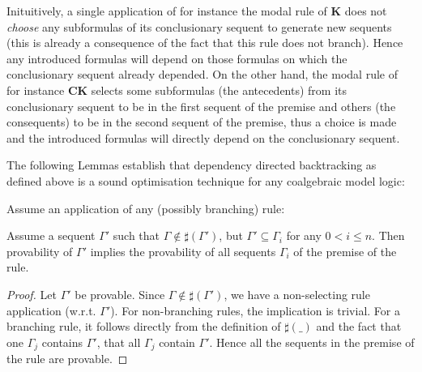\documentclass{llncs}
\begin{document}
Inituitively, a single application of for instance the modal rule of \textbf{K} 
does not \emph{choose} any subformulas of its conclusionary sequent to generate new sequents
(this is already a consequence of the fact that this rule does not branch).
Hence any introduced formulas will depend on those formulas on which the conclusionary sequent
already depended.
On the other hand, the modal rule of for instance \textbf{CK} selects some subformulas (the antecedents)
from its conclusionary sequent to be in the first sequent of the premise and others
(the consequents) to be in the second sequent of the premise, thus a choice is made and the
introduced formulas will directly depend on the conclusionary sequent.

The following Lemmas establish that dependency directed backtracking as defined above
is a sound optimisation technique for any coalgebraic model logic:

\begin{lemma}
Assume an application of any (possibly branching) rule:
\begin{quote}
\centerline{}
\end{quote}
Assume a sequent $\Gamma'$ such that $\Gamma\notin\sharp(\Gamma')$,
but $\Gamma'\subseteq \Gamma_i$ for any $0<i\leq n$.
Then provability of $\Gamma'$ implies the provability of all sequents $\Gamma_i$ of
the premise of the rule.
\begin{proof} Let $\Gamma'$ be provable. Since $\Gamma\notin\sharp(\Gamma')$, we have a non-selecting
rule application (w.r.t. $\Gamma'$). For non-branching rules, the implication is trivial. For a
branching rule, it follows directly from the definition of $\sharp(\_)$ and the fact that one
$\Gamma_j$ contains $\Gamma'$, that all $\Gamma_j$ contain $\Gamma'$.
Hence all the sequents in the premise of the rule are provable.
\end{proof}
\label{lemma:provabilityPropagates}
\end{lemma}

\end{document}
